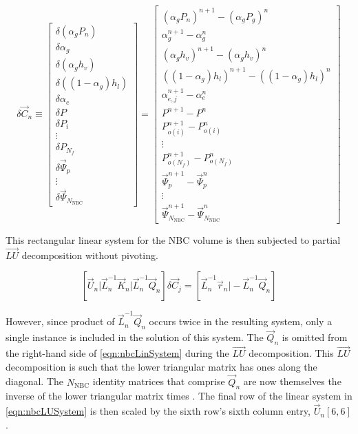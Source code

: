 \begin{equation}
\label{eqn:nbcUpdate}
\delta \vec{C}_{n} \equiv 
\begin{bmatrix}
\delta ( \alpha_{g} P_{n} ) \\
\delta \alpha_{g} \\
\delta ( \alpha_{g} h_v ) \\
\delta ( (1 - \alpha_{g} ) h_l ) \\
\delta \alpha_{e} \\
\delta P \\ 
\delta P_i \\
\vdots \\
\delta P_{N_{f}} \\
\delta \vec{\Psi}_{p} \\
\vdots \\
\delta \vec{\Psi}_{N_{\text{NBC}}}
\end{bmatrix}
=
\begin{bmatrix}
( \alpha_{g} P_{n})^{n+1} - (\alpha_{g} P_{g} )^{n} \\
\alpha^{n+1}_{g} - \alpha^{n}_{g} \\
( \alpha_{g} h_{v} )^{n+1} - ( \alpha_{g} h_{v} )^{n} \\
( ( 1 - \alpha_{g} ) h_{l} )^{n+1} - ( ( 1 - \alpha_{g} ) h_{l} )^{n} \\
\alpha^{n+1}_{e,j} - \alpha^{n}_{e} \\
 P^{n+1} - P^{n} \\
 P_{o(i)}^{n+1} - P_{o(i)}^{n} \\
 \vdots \\
 P_{o(N_{f})}^{n+1} - P_{o(N_{f})}^{n} \\
 \vec{\Psi}_{p}^{n+1} - \vec{\Psi}_{p}^{n} \\
 \vdots \\
 \vec{\Psi}_{N_{\text{NBC}}}^{n+1} - \vec{\Psi}_{N_{\text{NBC}}}^{n}
\end{bmatrix}
\end{equation}

This rectangular linear system for the NBC volume is then subjected to partial $\vec{LU}$ decomposition without pivoting.

\begin{equation}
\label{eqn:nbcLUSystem}
\left[ \vec{U}_{n} \vert \vec{L}^{-1}_{n}\vec{K}_{n} \vert \vec{L}^{-1}_{n}\vec{Q}_{n} \right] \delta \vec{C}_{j} = \left[\vec{L}^{-1}_{n}\vec{r}_{n} \vert -\vec{L}^{-1}_{n}\vec{Q}_{n}\right]
\end{equation}

However, since product of $\vec{L}_{n}^{-1}\vec{Q}_{n}$ occurs twice in the resulting system, only a single instance is included in the solution of this system.
The $\vec{Q}_{n}$ is omitted from the right-hand side of \eqref{eqn:nbcLinSystem} during the $\vec{LU}$ decomposition.
This $\vec{LU}$ decomposition is such that the lower triangular matrix has ones along the diagonal.
The $N_{\text{NBC}}$ identity matrices that comprise $\vec{Q}_{n}$ are now themselves the inverse of the lower triangular matrix times \dt{}.
The final row of the linear system in \eqref{eqn:nbcLUSystem} is then scaled by the sixth row's sixth column entry, $\vec{U}_{n}[6,6]$.

